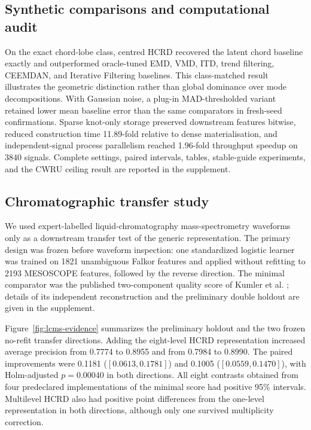 \documentclass[review,onefignum,onetabnum]{siamonline250211}
\providecommand{\citep}[1]{\cite{#1}}
\begin{document}
\subsection{Synthetic comparisons and computational audit}
On the exact chord-lobe class, centred HCRD recovered the latent chord baseline
exactly and outperformed oracle-tuned EMD, VMD, ITD, trend filtering, CEEMDAN,
and Iterative Filtering baselines.  This class-matched result illustrates the
geometric distinction rather than global dominance over mode decompositions.
With Gaussian noise, a plug-in MAD-thresholded variant retained lower mean
baseline error than the same comparators in fresh-seed confirmations.  Sparse
knot-only storage preserved downstream features bitwise, reduced construction
time 11.89-fold relative to dense materialisation, and independent-signal
process parallelism reached 1.96-fold throughput speedup on 3840 signals.
Complete settings, paired intervals, tables, stable-guide experiments, and the
CWRU ceiling result are reported in the supplement.


\subsection{Chromatographic transfer study}
\ifdefined\SIMODSsubmission
We used expert-labelled liquid-chromatography mass-spectrometry waveforms only
as a downstream transfer test of the generic representation.  The primary
design was frozen before waveform inspection: one standardized logistic
learner was trained on 1821 unambiguous Falkor features and applied without
refitting to 2193 MESOSCOPE features, followed by the reverse direction.  The
minimal comparator was the published two-component quality score of Kumler
et al. \citep{kumler2023picky}; details of its independent reconstruction and
the preliminary double holdout are given in the supplement.

Figure~\ref{fig:lcms-evidence} summarizes the preliminary holdout and the two
frozen no-refit transfer directions.
Adding the eight-level HCRD representation increased average precision from
0.7774 to 0.8955 and from 0.7984 to 0.8990.  The paired improvements were
0.1181 ($[0.0613,0.1781]$) and 0.1005 ($[0.0559,0.1470]$), with
Holm-adjusted $p=0.00040$ in both directions.  All eight contrasts obtained
from four predeclared implementations of the minimal score had positive 95\%
intervals.  Multilevel HCRD also had positive point differences from the
one-level representation in both directions, although only one survived
multiplicity correction.
\end{document}

